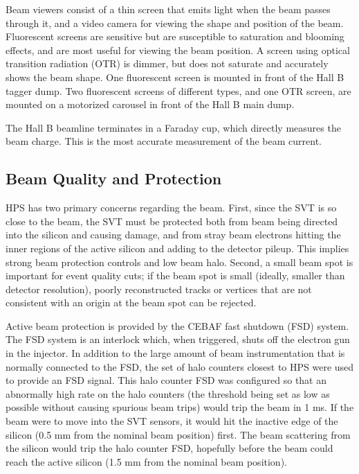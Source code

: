 Beam viewers consist of a thin screen that emits light when the beam passes through it, and a video camera for viewing the shape and position of the beam.
Fluorescent screens are sensitive but are susceptible to saturation and blooming effects, and are most useful for viewing the beam position.
A screen using optical transition radiation (OTR) is dimmer, but does not saturate and accurately shows the beam shape.
One fluorescent screen is mounted in front of the Hall B tagger dump.
Two fluorescent screens of different types, and one OTR screen, are mounted on a motorized carousel in front of the Hall B main dump.

The Hall B beamline terminates in a Faraday cup, which directly measures the beam charge.
This is the most accurate measurement of the beam current.

\subsection{Beam Quality and Protection}
\label{sec:beam_quality}
HPS has two primary concerns regarding the beam.
First, since the SVT is so close to the beam, the SVT must be protected both from beam being directed into the silicon and causing damage, and from stray beam electrons hitting the inner regions of the active silicon and adding to the detector pileup.
This implies strong beam protection controls and low beam halo.
Second, a small beam spot is important for event quality cuts; if the beam spot is small (ideally, smaller than detector resolution), poorly reconstructed tracks or vertices that are not consistent with an origin at the beam spot can be rejected.

Active beam protection is provided by the CEBAF fast shutdown (FSD) system.
The FSD system is an interlock which, when triggered, shuts off the electron gun in the injector.
In addition to the large amount of beam instrumentation that is normally connected to the FSD, the set of halo counters closest to HPS were used to provide an FSD signal.
This halo counter FSD was configured so that an abnormally high rate on the halo counters (the threshold being set as low as possible without causing spurious beam trips) would trip the beam in 1 ms.
If the beam were to move into the SVT sensors, it would hit the inactive edge of the silicon (0.5 mm from the nominal beam position) first.
The beam scattering from the silicon would trip the halo counter FSD, hopefully before the beam could reach the active silicon (1.5 mm from the nominal beam position).

